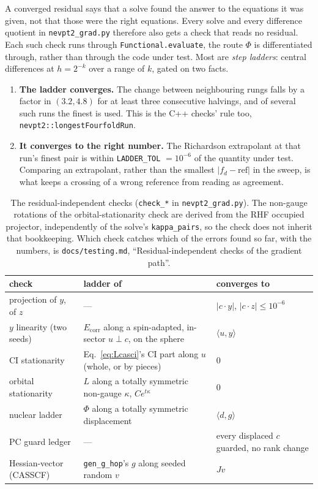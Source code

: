 \documentclass[11pt]{article}
\newcommand{\code}[1]{\texttt{#1}}
\newcommand{\Ecorr}{E_{\mathrm{corr}}}
\begin{document}
A converged residual says that a solve found the answer to the equations it
was given, not that those were the right equations. Every solve and every
difference quotient in \code{nevpt2\_grad.py} therefore also gets a check that
reads no residual. Each such check runs through \code{Functional.evaluate},
the route $\Phi$ is differentiated through, rather than through the code under
test. Most are \emph{step ladders}: central differences at $h = 2^{-k}$ over a
range of $k$, gated on two facts.
\begin{enumerate}
\item \textbf{The ladder converges.} The change between neighbouring rungs falls
  by a factor in $(3.2, 4.8)$ for at least three consecutive halvings, and of
  several such runs the finest is used. This is the C++ checks' rule too,
  \code{nevpt2::longestFourfoldRun}.
\item \textbf{It converges to the right number.} The Richardson extrapolant at
  that run's finest pair is within \code{LADDER\_TOL} $= 10^{-6}$ of the
  quantity under test. Comparing an extrapolant, rather than the smallest
  $|f_d - \mathrm{ref}|$ in the sweep, is what keeps a crossing of a wrong
  reference from reading as agreement.
\end{enumerate}

\begin{table}[htbp]
\centering
\small
\begin{tabular}{@{}p{}p{}p{}@{}}
\toprule
check & ladder of & converges to \\
\midrule
projection of $y$, of $z$ & --- & $|c\cdot y|$, $|c\cdot z| \le 10^{-6}$ \\
$y$ linearity (two seeds) & $\Ecorr$ along a spin-adapted, in-sector $u\perp c$, on the sphere & $\langle u, y\rangle$ \\
CI stationarity & Eq.~\eqref{eq:Lcasci}'s CI part along $u$ (whole, or by pieces) & $0$ \\
orbital stationarity & $L$ along a totally symmetric non-gauge $\kappa$, $C e^{t\kappa}$ & $0$ \\
nuclear ladder & $\Phi$ along a totally symmetric displacement & $\langle d, g\rangle$ \\
PC guard ledger & --- & every displaced $c$ guarded, no rank change \\
Hessian-vector (CASSCF) & \code{gen\_g\_hop}'s $g$ along seeded random $v$ & $Jv$ \\
\bottomrule
\end{tabular}
\caption{The residual-independent checks (\code{check\_*} in
\code{nevpt2\_grad.py}). The non-gauge rotations of the orbital-stationarity
check are derived from the RHF occupied projector, independently of the
solve's \code{kappa\_pairs}, so the check does not inherit that bookkeeping.
Which check catches which of the errors found so far, with the numbers, is
\code{docs/testing.md}, ``Residual-independent checks of the gradient
path''.}
\label{tab:checks}
\end{table}
\end{document}
